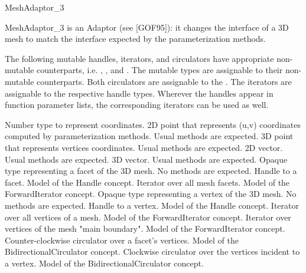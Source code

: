 \begin{ccRefConcept}{MeshAdaptor_3}

MeshAdaptor\_3 is an Adaptor (see [GOF95]): it changes the interface of a 3D mesh to match the interface expected by the parameterization methods.





\ccTypes

The following mutable handles, iterators, and circulators have appropriate
non-mutable counterparts, i.e. ,
, and . The mutable types are
assignable to their non-mutable counterparts.  Both circulators are
assignable to the . The iterators are
assignable to the respective handle types. Wherever the handles appear
in function parameter lists, the corresponding iterators can be used as
well.

{
Number type to represent coordinates.
}
{
2D point that represents (u,v) coordinates computed by parameterization methods. Usual methods are expected.
}
{
3D point that represents vertices coordinates. Usual methods are expected.
}
{
2D vector. Usual methods are expected.
}
{
3D vector. Usual methods are expected.
}
{
Opaque type representing a facet of the 3D mesh. No methods are expected.
}
{
Handle to a facet. Model of the Handle concept.
}
{
}
{
Iterator over all mesh facets. Model of the ForwardIterator concept.
}
{
}
{
Opaque type representing a vertex of the 3D mesh. No methods are expected.
}
{
Handle to a vertex. Model of the Handle concept.
}
{
}
{
Iterator over all vertices of a mesh. Model of the ForwardIterator concept.
}
{
}
{
Iterator over vertices of the mesh "main boundary". Model of the ForwardIterator concept.
}
{
}
{
Counter-clockwise circulator over a facet's vertices. Model of the BidirectionalCirculator concept.
}
{
}
{
Clockwise circulator over the vertices incident to a vertex. Model of the BidirectionalCirculator concept.
}
{
}



\end{ccRefConcept}
